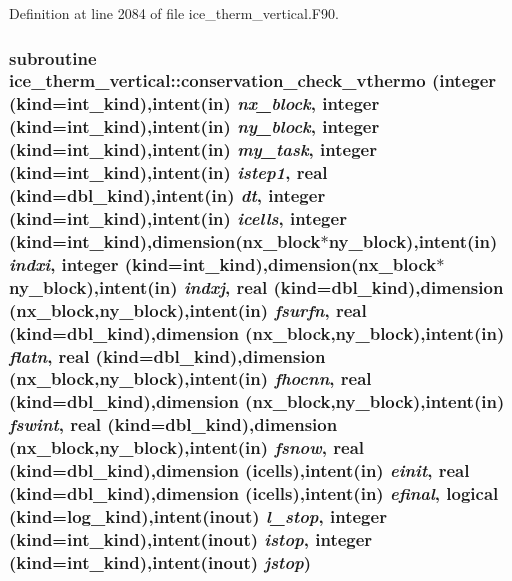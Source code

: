 Definition at line 2084 of file ice\_\-therm\_\-vertical.F90.\hypertarget{namespaceice__therm__vertical_a4f2f790706910417fe9bbaaa1ad6efa3}{
\subsubsection[{conservation\_\-check\_\-vthermo}]{\setlength{\rightskip}{0pt plus 5cm}subroutine ice\_\-therm\_\-vertical::conservation\_\-check\_\-vthermo (integer (kind=int\_\-kind),intent(in) {\em nx\_\-block}, \/  integer (kind=int\_\-kind),intent(in) {\em ny\_\-block}, \/  integer (kind=int\_\-kind),intent(in) {\em my\_\-task}, \/  integer (kind=int\_\-kind),intent(in) {\em istep1}, \/  real (kind=dbl\_\-kind),intent(in) {\em dt}, \/  integer (kind=int\_\-kind),intent(in) {\em icells}, \/  integer (kind=int\_\-kind),dimension(nx\_\-block$\ast$ny\_\-block),intent(in) {\em indxi}, \/  integer (kind=int\_\-kind),dimension(nx\_\-block$\ast$ny\_\-block),intent(in) {\em indxj}, \/  real (kind=dbl\_\-kind),dimension (nx\_\-block,ny\_\-block),intent(in) {\em fsurfn}, \/  real (kind=dbl\_\-kind),dimension (nx\_\-block,ny\_\-block),intent(in) {\em flatn}, \/  real (kind=dbl\_\-kind),dimension (nx\_\-block,ny\_\-block),intent(in) {\em fhocnn}, \/  real (kind=dbl\_\-kind),dimension (nx\_\-block,ny\_\-block),intent(in) {\em fswint}, \/  real (kind=dbl\_\-kind),dimension (nx\_\-block,ny\_\-block),intent(in) {\em fsnow}, \/  real (kind=dbl\_\-kind),dimension (icells),intent(in) {\em einit}, \/  real (kind=dbl\_\-kind),dimension (icells),intent(in) {\em efinal}, \/  logical (kind=log\_\-kind),intent(inout) {\em l\_\-stop}, \/  integer (kind=int\_\-kind),intent(inout) {\em istop}, \/  integer (kind=int\_\-kind),intent(inout) {\em jstop})}}
\label{namespaceice__therm__vertical_a4f2f790706910417fe9bbaaa1ad6efa3}


